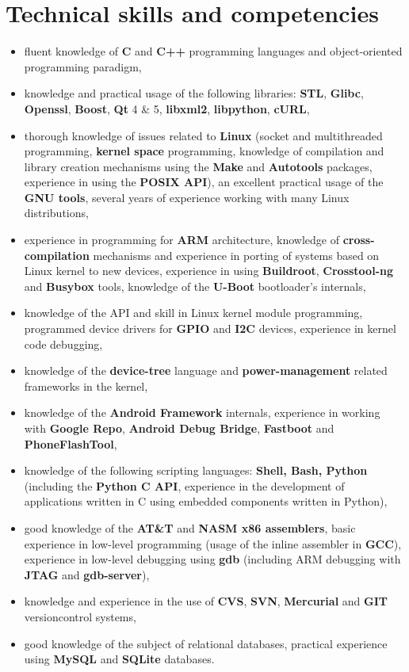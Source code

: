 \documentclass[10pt]{article}
\begin{document}
\section*{Technical skills and competencies}
\begin{itemize}
	\item fluent knowledge of \textbf{C} and \textbf{C++} programming languages and
	object-oriented programming paradigm,
	\item knowledge and practical usage of the following libraries: \textbf{STL},
	\textbf{Glibc}, \textbf{Openssl}, \textbf{Boost}, \textbf{Qt} 4 \& 5, \textbf{libxml2},
	\textbf{libpython}, \textbf{cURL},
	\item thorough knowledge of issues related to \textbf{Linux} (socket and multithreaded
	programming, \textbf{kernel space} programming, knowledge of compilation and library
	creation mechanisms using the \textbf{Make} and \textbf{Autotools} packages, experience in
	using the \textbf{POSIX API}), an excellent practical usage of the \textbf{GNU tools},
	several years of experience working with many Linux distributions,
	\item experience in programming for \textbf{ARM} architecture, knowledge of \textbf{cross-
	compilation} mechanisms and experience in porting of systems based on Linux kernel to new
	devices, experience in using \textbf{Buildroot}, \textbf{Crosstool-ng} and
	\textbf{Busybox} tools, knowledge of the \textbf{U-Boot} bootloader's internals,
	\item knowledge of the API and skill in Linux kernel module programming, programmed
	device drivers for \textbf{GPIO} and \textbf{I2C} devices, experience in kernel code
	debugging,
	\item knowledge of the \textbf{device-tree} language and \textbf{power-management} related
	frameworks in the kernel,
	\item knowledge of the \textbf{Android Framework} internals, experience in working with
	\textbf{Google Repo}, \textbf{Android Debug Bridge}, \textbf{Fastboot} and
	\textbf{PhoneFlashTool},
	\item knowledge of the following scripting languages: \textbf{Shell, Bash, Python}
	(including the \textbf{Python C API}, experience in the development of applications
	written in C using embedded components written in Python),
	\item good knowledge of the \textbf{AT\&T} and \textbf{NASM x86 assemblers}, basic
	experience in low-level programming (usage of the inline assembler in \textbf{GCC}),
	experience in low-level debugging using \textbf{gdb} (including ARM debugging with
	\textbf{JTAG} and \textbf{gdb-server}),
	\item knowledge and experience in the use of \textbf{CVS}, \textbf{SVN},
	\textbf{Mercurial} and \textbf{GIT} versioncontrol systems,
	\item good knowledge of the subject of relational databases, practical experience using
	\textbf{MySQL} and \textbf{SQLite} databases.
\end{itemize}
\end{document}
